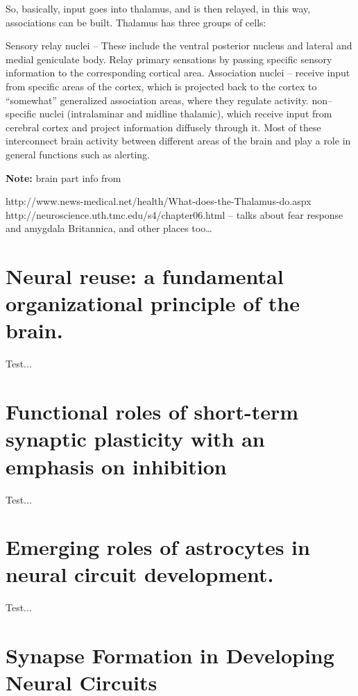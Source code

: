 \documentclass[11pt, a4paper, oneside]{article}   	%
\begin{document}
So, basically, input goes into thalamus, and is then relayed, in this way, associations can be built. Thalamus has three groups of cells:
\begin{outline}
\point Sensory relay nuclei -- These include the ventral posterior nucleus and lateral and medial geniculate body. Relay primary sensations by passing specific sensory information to the corresponding cortical area. 
\point Association nuclei -- receive input from specific areas of the cortex, which is projected back to the cortex to ``somewhat'' generalized association areas, where they regulate activity.
\point non--specific nuclei (intralaminar and midline thalamic), which receive input from cerebral cortex and project information diffusely through it. Most of these interconnect brain activity between different areas of the brain and play a role in general functions such as alerting.
\end{outline}

\textbf{Note:} brain part info from

\begin{outline}
    \point http://www.news-medical.net/health/What-does-the-Thalamus-do.aspx
    \point http://neuroscience.uth.tmc.edu/s4/chapter06.html -- talks about fear response and amygdala
    \point Britannica, and other places too\ldots
\end{outline}





\section{Neural reuse: a fundamental organizational principle of the brain. \cite{Anderson2010}}

Test...

\section{Functional roles of short-term synaptic plasticity with an emphasis on inhibition \cite{Anwar2017}}

Test...

\section{Emerging roles of astrocytes in neural circuit development. \cite{Clarke2013}}

Test...

\section{Synapse Formation in Developing Neural Circuits \cite{Colon-Ramos2009}}
\end{document}
